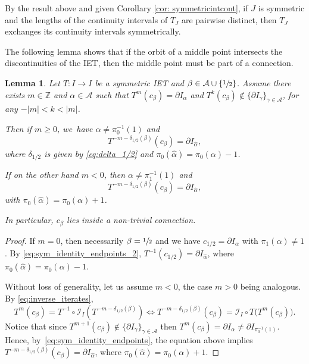 \documentclass[JEP,XML,SOM,Unicode,NoEqCountersInSection,NoFloatCountersInSection,published]{cedram}
\theoremstyle{plain}
\newtheorem{lemma}[theorem]{Lemma}
\theoremstyle{definition}
\newcommand{\A}{\mathcal{A}}
\newcommand{\I}{\mathcal{I}}
\newcommand{\Z}{\mathbb{Z}}
\begin{document}
By the result above and given Corollary \ref{cor: symmetricintcont}, if $J$ is symmetric and the lengths of the continuity intervals of $T_J$ are pairwise distinct, then $T_J$ exchanges its continuity intervals symmetrically.

The following lemma shows that if the orbit of a middle point intersects the discontinuities of the IET, then the middle point must be part of a connection.

\begin{lemma}
\label{lem:symmetric_connection}
Let $T: I \to I$ be a symmetric IET and $\beta \in \A \cup \{\sfrac{1}{2}\}$. Assume there exists $m \in \Z$ and $\alpha \in \A$ such that $T^m(c_\beta) = \partial I_\alpha$ and $T^k(c_\beta) \notin \{\partial I_\gamma\}_{\gamma \in \A}$, for any $-|m| < k < |m|$.

Then {if $m\ge 0$}, we~have $\alpha \neq \pi_0^{-1}(1)$ and\vspace*{-3pt}
\[
T^{-m - \delta_{1/2}(\beta)}(c_\beta) = \partial I_{\hat \alpha},
\]
where $\delta_{1/2}$ is given by \eqref{eq:delta_1/2} and $\pi_0( \hat \alpha) = \pi_0(\alpha) - 1$.

{If on the other hand $m<0$, then $\alpha\neq \pi_1^{-1}(1)$ and\vspace*{-3pt}
\[
T^{-m - \delta_{1/2}(\beta)}(c_\beta) = \partial I_{\hat \alpha},
\]
with $\pi_0( \hat \alpha) = \pi_0(\alpha) + 1$.
}

In particular, $c_\beta$ lies inside a non-trivial connection.
\end{lemma}

\begin{proof}

If $m = 0$, then necessarily $\beta = \sfrac{1}{2}$ and we have $c_{1/2} = \partial I_\alpha$ with $\pi_1(\alpha) \neq 1$. By \eqref{eq:sym_identity_endpoints_2}, $T^{-1}(c_{1/2}) = \partial I_{\hat \alpha}$, where $\pi_0( \hat \alpha) = \pi_0(\alpha) - 1$.

Without loss of generality, let us assume $m < 0$, the case $m > 0$ being analogous. By \eqref{eq:inverse_iterates},
\begin{equation*}
\label{eq:inverse_iterates_negative}
T^m(c_{\beta})=T^{-1}\circ \I_I(T^{-m-\delta_{1/2}(\beta)})\iff T^{-m- \delta_{1/2}(\beta) }(c_\beta) = \I_I\circ T \big( T^{m}(c_\beta)\big).
\end{equation*}
Notice that since $T^{m + 1}(c_\beta) \notin \{\partial I_\gamma\}_{\gamma \in \A}$ then $T^{m}(c_\beta) = \partial I_\alpha \neq \partial I_{\pi_0^{-1}(1)}$. Hence, by~\eqref{eq:sym_identity_endpoints}, the equation above implies $T^{-m - \delta_{1/2}(\beta)}(c_\beta) = \partial I_{\hat \alpha}$, where \hbox{$\pi_0( \hat \alpha) = \pi_0(\alpha) + 1$}.
\end{proof}
\end{document}
